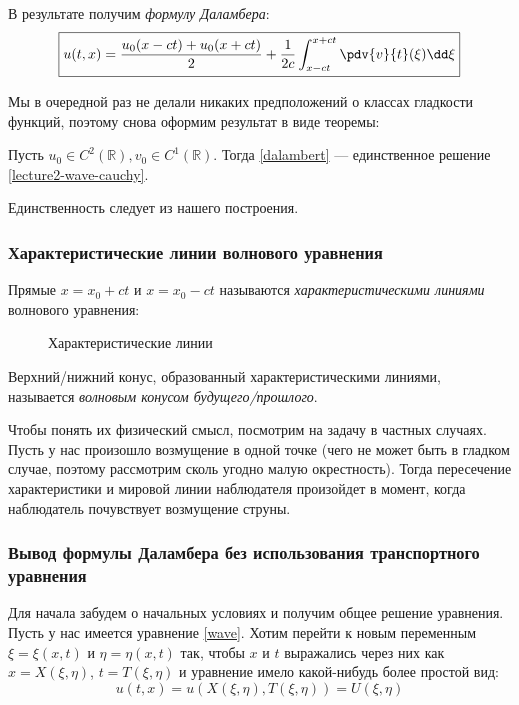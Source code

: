 В результате получим \emph{формулу Даламбера}:
%
\begin{equation}
  \boxed{u(t, x) = \frac{u_0(x - ct) + u_0(x + ct)}{2} + \frac{1}{2c} \int_{x-ct}^{x+ct} \pdv{v}{t}(\xi) \dd \xi} \label{dalambert}
\end{equation}

Мы в очередной раз не делали никаких предположений о классах гладкости функций, поэтому снова оформим результат в виде теоремы:
%
\begin{thm}
  Пусть $u_0 \in C^2(\mathbb{R}), v_0 \in C^1(\mathbb{R})$. Тогда \eqref{dalambert} --- единственное решение \eqref{lecture2-wave-cauchy}.
\end{thm}

Единственность следует из нашего построения.

\subsubsection{Характеристические линии волнового уравнения}

Прямые $x = x_0 + ct$ и $x = x_0 - ct$ называются \emph{характеристическими линиями} волнового уравнения:

\begin{figure}[ht]
  \centering
  \caption{Характеристические линии}
\end{figure}

Верхний/нижний конус, образованный характеристическими линиями, называется \emph{волновым конусом будущего/прошлого}.

Чтобы понять их физический смысл, посмотрим на задачу в частных случаях. Пусть у нас произошло возмущение в одной точке (чего не может быть в гладком случае, поэтому рассмотрим сколь угодно малую окрестность). Тогда пересечение характеристики и мировой линии наблюдателя произойдет в момент, когда наблюдатель почувствует возмущение струны.


\subsubsection{Вывод формулы Даламбера без использования транспортного уравнения}

Для начала забудем о начальных условиях и получим общее решение уравнения. Пусть у нас имеется уравнение \eqref{wave}. Хотим перейти к новым переменным $\xi = \xi(x, t)$ и $\eta = \eta(x, t)$ так, чтобы $x$ и $t$ выражались через них как $x = X(\xi, \eta)$, $t = T(\xi, \eta)$ и уравнение имело какой-нибудь более простой вид:
\begin{equation}
  u(t, x) = u(X(\xi, \eta), T(\xi, \eta)) = U(\xi, \eta)
\end{equation}

